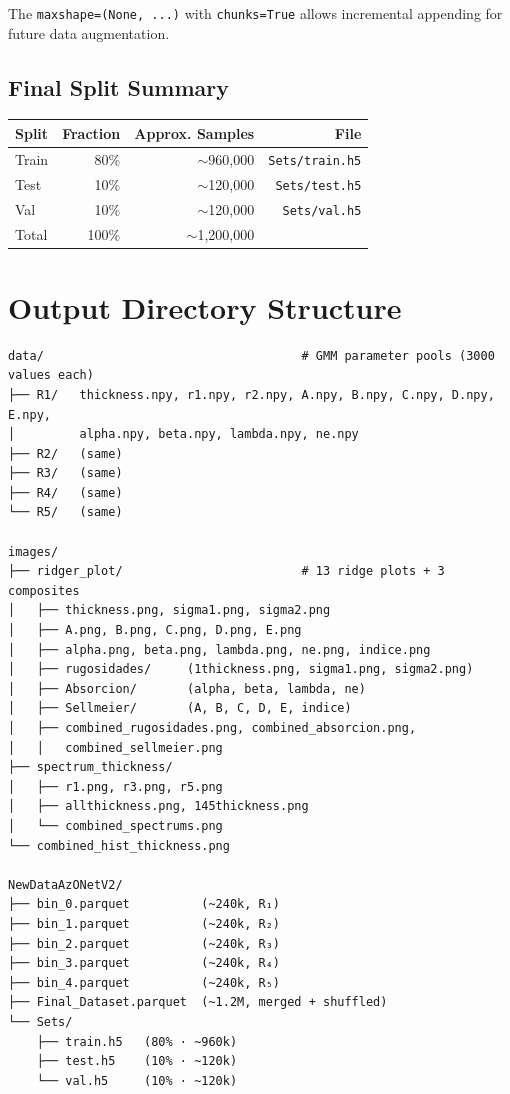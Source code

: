 \documentclass[11pt,a4paper]{article}
\begin{document}
The {\tt maxshape=(None, ...)} with {\tt chunks=True} allows incremental appending for future data augmentation.

\subsection{Final Split Summary}

\begin{table}[htbp]
\centering
\begin{tabular}{lrrr}
\toprule
\textbf{Split} & \textbf{Fraction} & \textbf{Approx. Samples} & \textbf{File} \\
\midrule
Train & 80\%  & $\sim$960,000 & {\tt Sets/train.h5} \\
Test  & 10\%  & $\sim$120,000 & {\tt Sets/test.h5} \\
Val   & 10\%  & $\sim$120,000 & {\tt Sets/val.h5} \\
\midrule
Total & 100\% & $\sim$1,200,000 & \\
\bottomrule
\end{tabular}
\end{table}

\section{Output Directory Structure}

\begin{verbatim}
data/                                    # GMM parameter pools (3000 values each)
├── R1/   thickness.npy, r1.npy, r2.npy, A.npy, B.npy, C.npy, D.npy, E.npy,
│         alpha.npy, beta.npy, lambda.npy, ne.npy
├── R2/   (same)
├── R3/   (same)
├── R4/   (same)
└── R5/   (same)

images/
├── ridger_plot/                         # 13 ridge plots + 3 composites
│   ├── thickness.png, sigma1.png, sigma2.png
│   ├── A.png, B.png, C.png, D.png, E.png
│   ├── alpha.png, beta.png, lambda.png, ne.png, indice.png
│   ├── rugosidades/     (1thickness.png, sigma1.png, sigma2.png)
│   ├── Absorcion/       (alpha, beta, lambda, ne)
│   ├── Sellmeier/       (A, B, C, D, E, indice)
│   ├── combined_rugosidades.png, combined_absorcion.png,
│   │   combined_sellmeier.png
├── spectrum_thickness/
│   ├── r1.png, r3.png, r5.png
│   ├── allthickness.png, 145thickness.png
│   └── combined_spectrums.png
└── combined_hist_thickness.png

NewDataAzONetV2/
├── bin_0.parquet          (~240k, R₁)
├── bin_1.parquet          (~240k, R₂)
├── bin_2.parquet          (~240k, R₃)
├── bin_3.parquet          (~240k, R₄)
├── bin_4.parquet          (~240k, R₅)
├── Final_Dataset.parquet  (~1.2M, merged + shuffled)
└── Sets/
    ├── train.h5   (80% · ~960k)
    ├── test.h5    (10% · ~120k)
    └── val.h5     (10% · ~120k)
\end{verbatim}
\end{document}
